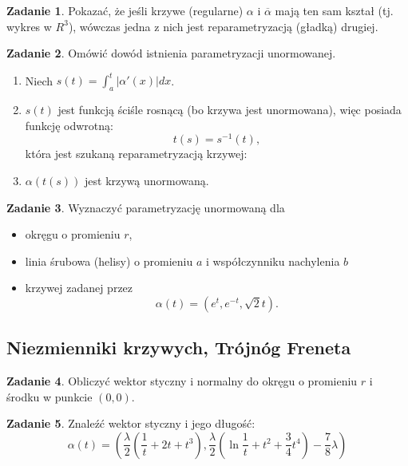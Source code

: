 \documentclass[a4paper,11pt]{article}
\theoremstyle{definition}\newtheorem{exercise}{Zadanie}
\theoremstyle{definition}\newtheorem{remark}{Uwaga}
\begin{document}
\begin{exercise}
Pokazać, że jeśli krzywe (regularne) $\alpha$ i $\overline{\alpha}$ mają ten 
sam kształ (tj. wykres w $R^3$), w\'owczas jedna z nich jest 
reparametryzacją (gładką) drugiej.
\end{exercise}

\begin{exercise}
Omówić dowód istnienia parametryzacji unormowanej.
\begin{enumerate}
 \item Niech $s(t)=\int_{a}^t|\alpha'(x)|dx$.
\item $s(t)$ jest funkcją ściśle rosnącą (bo krzywa jest unormowana), więc 
posiada funkcję odwrotną:\[t(s)=s^{-1}(t),\] która jest szukaną 
reparametryzacją krzywej:
\item $\alpha(t(s))$ jest krzywą unormowaną.
\end{enumerate}
\end{exercise}

\begin{exercise}
Wyznaczyć parametryzację unormowaną dla
\begin{itemize}
\item okręgu o promieniu $r$,
\item linia śrubowa (helisy) o promieniu $a$ i współczynniku nachylenia $b$
\item krzywej zadanej przez \[\alpha(t)=\left(e^t,e^{-t},\sqrt{2}t\right).\]
\end{itemize}
\end{exercise}


\subsection{Niezmienniki krzywych, Tr\'ojn\'og Freneta}

\begin{exercise}
Obliczyć wektor styczny i normalny do okręgu o promieniu $r$ i środku w 
punkcie $(0,0)$.
\end{exercise}

\begin{exercise}
Znaleźć wektor styczny i jego długość:
\[\alpha(t)=\left(\frac{\lambda}{2}\left(\frac{1}{t}+2t+t^3\right),\frac{\lambda
}{2}\left(\ln 
{\frac{1}{t}}+t^2+\frac{3}{4}t^4\right)-\frac{7}{8}\lambda\right)\]
\end{exercise}
\end{document}
